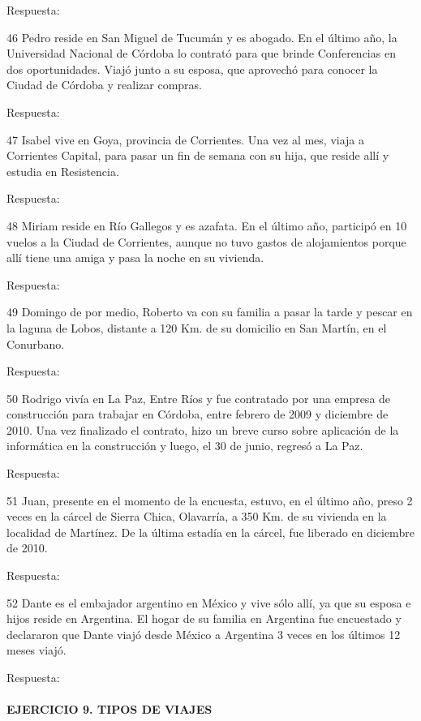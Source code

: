 \documentclass[
  openany]{book}
\begin{document}
Respuesta:

46 Pedro reside en San Miguel de Tucumán y es abogado. En el último año, la Universidad Nacional de Córdoba lo contrató para que brinde Conferencias en dos oportunidades. Viajó junto a su esposa, que aprovechó para conocer la Ciudad de Córdoba y realizar compras.

Respuesta:

47 Isabel vive en Goya, provincia de Corrientes. Una vez al mes, viaja a Corrientes Capital, para pasar un fin de semana con su hija, que reside allí y estudia en Resistencia.

Respuesta:

48 Miriam reside en Río Gallegos y es azafata. En el último año, participó en 10 vuelos a la Ciudad de Corrientes, aunque no tuvo gastos de alojamientos porque allí tiene una amiga y pasa la noche en su vivienda.

Respuesta:

49 Domingo de por medio, Roberto va con su familia a pasar la tarde y pescar en la laguna de Lobos, distante a 120 Km. de su domicilio en San Martín, en el Conurbano.

Respuesta:

50 Rodrigo vivía en La Paz, Entre Ríos y fue contratado por una empresa de construcción para trabajar en Córdoba, entre febrero de 2009 y diciembre de 2010. Una vez finalizado el contrato, hizo un breve curso sobre aplicación de la informática en la construcción y luego, el 30 de junio, regresó a La Paz.

Respuesta:

51 Juan, presente en el momento de la encuesta, estuvo, en el último año, preso 2 veces en la cárcel de Sierra Chica, Olavarría, a 350 Km. de su vivienda en la localidad de Martínez. De la última estadía en la cárcel, fue liberado en diciembre de 2010.

Respuesta:

52 Dante es el embajador argentino en México y vive sólo allí, ya que su esposa e hijos reside en Argentina. El hogar de su familia en Argentina fue encuestado y declararon que Dante viajó desde México a Argentina 3 veces en los últimos 12 meses viajó.

Respuesta:

\hypertarget{ejercicio-9.-tipos-de-viajes}{%
\paragraph{\texorpdfstring{\textbf{EJERCICIO 9. TIPOS DE VIAJES}}{EJERCICIO 9. TIPOS DE VIAJES}}\label{ejercicio-9.-tipos-de-viajes}}
\end{document}
